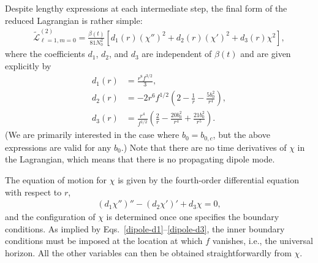 \documentclass[aps,prd,preprintnumbers,superscriptaddress,nofootinbib,notitlepage]{revtex4-2}
\begin{document}
Despite lengthy expressions at each intermediate step, the final form of the reduced Lagrangian is rather simple:
\begin{align}
    \widetilde{\mathcal L}^{(2)}_{\ell=1,m=0}=\frac{\beta(t)}{81N_0^2}
    \left[d_1(r)(\chi'')^2+d_2(r)(\chi')^2+d_3(r)\chi^2\right],
\end{align}
where the coefficients $d_1$, $d_2$, and $d_3$ are independent of $\beta(t)$ and are given explicitly by
\begin{align}
    d_1(r)&=\frac{r^8f^{3/2}}{3},\label{dipole-d1}
    \\ 
    d_2(r)&=-2r^6f^{1/2}\left(2-\frac{1}{r}-\frac{5b_0^2}{r^4}\right),
    \label{diole-d2}
    \\ 
    d_3(r)&=\frac{r^4}{f^{1/2}}\left(\frac{2}{r}-\frac{20b_0^2}{r^4}
    +\frac{21b_0^{2}}{r^5}\right).\label{dipole-d3}
\end{align}
(We are primarily interested in the case where $b_0=b_{0,c}$, but the above expressions are valid for any $b_0$.)
Note that there are no time derivatives of $\chi$ in the Lagrangian, which means that there is no propagating dipole mode.



The equation of motion for $\chi$ is given by the fourth-order differential equation with respect to $r$, 
\begin{align}
    \left(d_1\chi''\right)''-\left(d_2\chi'\right)'+d_3\chi=0,\label{eq:chi}
\end{align}
and the configuration of $\chi$ is determined once one specifies the boundary conditions.
As implied by Eqs.~\eqref{dipole-d1}--\eqref{dipole-d3}, the inner boundary conditions must be imposed at the location at which $f$ vanishes, i.e., the universal horizon.
All the other variables can then be obtained straightforwardly from $\chi$.
\end{document}
